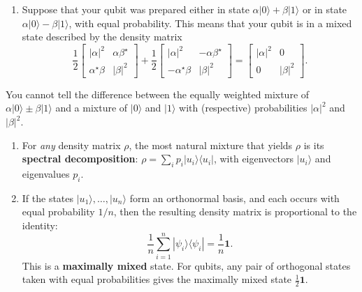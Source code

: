 \documentclass[fleqn]{article}
\providecommand{\tightlist}{%
  \setlength{\itemsep}{0pt}\setlength{\parskip}{0pt}}
\newenvironment{idea}{\noindent}{\medskip}
\begin{document}
\begin{enumerate}
\def\labelenumi{\arabic{enumi}.}
\setcounter{enumi}{2}
\tightlist
\item
  Suppose that your qubit was prepared either in state \(\alpha|0\rangle + \beta|1\rangle\) or in state \(\alpha|0\rangle - \beta|1\rangle\), with equal probability.
  This means that your qubit is in a mixed state described by the density matrix
  \[
     \frac{1}{2}
     \begin{bmatrix}
       |\alpha|^2 & \alpha\beta^\star
     \\\alpha^\star\beta & |\beta|^2
     \end{bmatrix}
     +\frac{1}{2}
     \begin{bmatrix}
       |\alpha|^2 & -\alpha\beta^\star
     \\-\alpha^\star\beta & |\beta|^2
     \end{bmatrix}
     = \begin{bmatrix}
       |\alpha|^2 & 0
     \\0 & |\beta|^2
     \end{bmatrix}.
   \]
\end{enumerate}

\begin{idea}
You cannot tell the difference between the equally weighted mixture of \(\alpha|0\rangle\pm\beta|1\rangle\) and a mixture of \(|0\rangle\) and \(|1\rangle\) with (respective) probabilities \(|\alpha|^2\) and \(|\beta|^2\).

\end{idea}

\begin{enumerate}
\def\labelenumi{\arabic{enumi}.}
\setcounter{enumi}{3}
\item
  For \emph{any} density matrix \(\rho\), the most natural mixture that yields \(\rho\) is its \textbf{spectral decomposition}: \(\rho=\sum_i p_i|u_i\rangle\langle u_i|\), with eigenvectors \(|u_i\rangle\) and eigenvalues \(p_i\).
\item
  If the states \(|u_1\rangle,\ldots,|u_n\rangle\) form an orthonormal basis, and each occurs with equal probability \(1/n\), then the resulting density matrix is proportional to the identity:
  \[
     \frac{1}{n}\sum_{i=1}^n |\psi_i\rangle\langle\psi_i|
     = \frac{1}{n}\mathbf{1}.
   \]
  This is a \textbf{maximally mixed} state.
  For qubits, any pair of orthogonal states taken with equal probabilities gives the maximally mixed state \(\frac{1}{2}\mathbf{1}\).
\end{enumerate}
\end{document}

